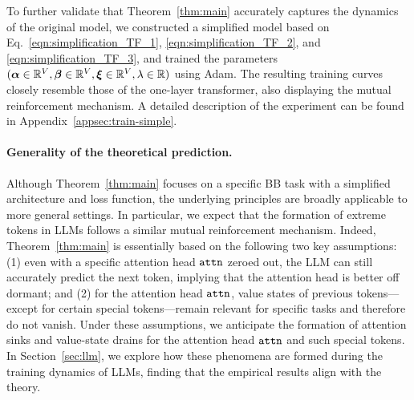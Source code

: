 To further validate that Theorem~\ref{thm:main} accurately captures the dynamics of the original model, we constructed a simplified model based on Eq.~\eqref{eqn:simplification_TF_1}, \eqref{eqn:simplification_TF_2}, and \eqref{eqn:simplification_TF_3}, and trained the parameters $(\bm{\alpha} \in \mathbb{R}^{V}, \boldsymbol{\beta} \in \mathbb{R}^V, \bm{\xi} \in \mathbb{R}^V, \lambda \in \mathbb{R})$ using Adam. The resulting training curves closely resemble those of the one-layer transformer, also displaying the mutual reinforcement mechanism. A detailed description of the experiment can be found in Appendix~\ref{appsec:train-simple}. 



\paragraph{Generality of the theoretical prediction.} Although Theorem~\ref{thm:main} focuses on a specific BB task with a simplified architecture and loss function, the underlying principles are broadly applicable to more general settings. In particular, we expect that the formation of extreme tokens in LLMs follows a similar mutual reinforcement mechanism. Indeed, Theorem~\ref{thm:main} is essentially based on the following two key assumptions: (1) even with a specific attention head ${\tt attn}$ zeroed out, the LLM can still accurately predict the next token, implying that the attention head is better off dormant; and (2) for the attention head ${\tt attn}$, value states of previous tokens—except for certain special tokens—remain relevant for specific tasks and therefore do not vanish. Under these assumptions, we anticipate the formation of attention sinks and value-state drains for the attention head ${\tt attn}$ and such special tokens. In Section~\ref{sec:llm}, we explore how these phenomena are formed during the training dynamics of LLMs, finding that the empirical results align with the theory. 

